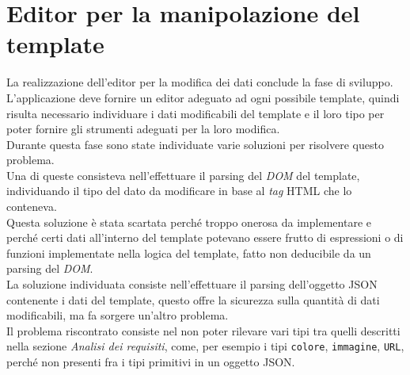 \section{Editor per la manipolazione del template}
La realizzazione dell'editor per la modifica dei dati conclude la fase di sviluppo.\\
L'applicazione deve fornire un editor adeguato ad ogni possibile template, quindi risulta necessario individuare i dati modificabili del template e il loro tipo per poter fornire gli strumenti adeguati per la loro modifica.\\
Durante questa fase sono state individuate varie soluzioni per risolvere questo problema.\\
Una di queste consisteva nell'effettuare il parsing del \textit{DOM} del template, individuando il tipo del dato da modificare in base al \textit{tag} HTML che lo conteneva.\\
Questa soluzione è stata scartata perché troppo onerosa da implementare e perché certi dati all'interno del template potevano essere frutto di espressioni o di funzioni implementate nella logica del template, fatto non deducibile da un parsing del \textit{DOM}.\\
La soluzione individuata consiste nell'effettuare il parsing dell'oggetto JSON contenente i dati del template, questo offre la sicurezza sulla quantità di dati modificabili, ma fa sorgere un'altro problema.\\
Il problema riscontrato consiste nel non poter rilevare vari tipi tra quelli descritti nella sezione \textit{Analisi dei requisiti}, come, per esempio i tipi \texttt{colore}, \texttt{immagine}, \texttt{URL}, perché non presenti fra i tipi primitivi in un oggetto JSON.\\
